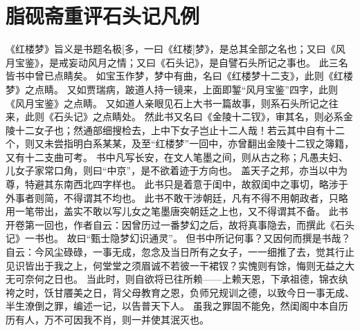 
\chapter[脂砚斋重评石头记凡例]{脂砚斋重评石头记凡例}
《红楼梦》旨义\qquad 是书题名极[多，一曰《红楼]梦》，是总其全部之名也；又曰《风月宝鉴》，是戒妄动风月之情；又曰《石头记》，是自譬石头所记之事也。
此三名皆书中曾已点睛矣。
如宝玉作梦，梦中有曲，名曰《红楼梦十二支》，此则《红楼梦》之点睛。
又如贾瑞病，跛道人持一镜来，上面即錾“风月宝鉴”四字，此则《风月宝鉴》之点睛。
又如道人亲眼见石上大书一篇故事，则系石头所记之往来，此则《石头记》之点睛处。
然此书又名曰《金陵十二钗》，审其名，则必系金陵十二女子也；然通部细搜检去，上中下女子岂止十二人哉！若云其中自有十二个，则又未尝指明白系某某，及至“红楼梦”一回中，亦曾翻出金陵十二钗之簿籍，又有十二支曲可考。
书中凡写长安，在文人笔墨之间，则从古之称；凡愚夫妇、儿女子家常口角，则曰“中京”，是不欲着迹于方向也。
盖天子之邦，亦当以中为尊，特避其东南西北四字样也。
此书只是着意于闺中，故叙闺中之事切，略涉于外事者则简，不得谓其不均也。
此书不敢干涉朝廷，凡有不得不用朝政者，只略用一笔带出，盖实不敢以写儿女之笔墨唐突朝廷之上也，又不得谓其不备。
此书开卷第一回也，作者自云：因曾历过一番梦幻之后，故将真事隐去，而撰此《石头记》一书也。
故曰“甄士隐梦幻识通灵”。
但书中所记何事？又因何而撰是书哉？自云：今风尘碌碌，一事无成，忽念及当日所有之女子，一一细推了去，觉其行止见识皆出于我之上，何堂堂之须眉诚不若彼一干裙钗？实愧则有馀，悔则无益之大无可奈何之日也。
当此时，则自欲将已往所赖——上赖天恩，下承祖德，锦衣纨袴之时，饫甘餍美之日，背父母教育之恩，负师兄规训之德，以致今日一事无成、半生潦倒之罪，编述一记，以告普天下人。
虽我之罪固不能免，然闺阁中本自历历有人，万不可因我不肖，则一并使其泯灭也。
